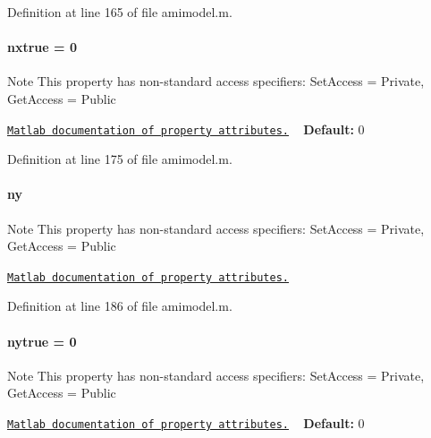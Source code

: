 Definition at line 165 of file amimodel.\+m.

\hypertarget{classamimodel_a49c476de14a021114feb8c95da04952a}{}
\paragraph[{nxtrue}]{\setlength{\rightskip}{0pt plus 5cm}nxtrue = 0}\label{classamimodel_a49c476de14a021114feb8c95da04952a}
\begin{DoxyNote}{Note}
This property has non-\/standard access specifiers\+: {\ttfamily Set\+Access = Private, Get\+Access = Public} 

\href{http://www.mathworks.com/help/matlab/matlab_oop/property-attributes.html}{\tt Matlab documentation of property attributes.} ~\newline
{\bfseries Default\+:} 0 
\end{DoxyNote}


Definition at line 175 of file amimodel.\+m.

\hypertarget{classamimodel_a289ca425eb368f1d582b6be2be0d3dfc}{}
\paragraph[{ny}]{\setlength{\rightskip}{0pt plus 5cm}ny}\label{classamimodel_a289ca425eb368f1d582b6be2be0d3dfc}
\begin{DoxyNote}{Note}
This property has non-\/standard access specifiers\+: {\ttfamily Set\+Access = Private, Get\+Access = Public} 

\href{http://www.mathworks.com/help/matlab/matlab_oop/property-attributes.html}{\tt Matlab documentation of property attributes.} 
\end{DoxyNote}


Definition at line 186 of file amimodel.\+m.

\hypertarget{classamimodel_ac91d7b36031ec122abc9f739692b02e8}{}
\paragraph[{nytrue}]{\setlength{\rightskip}{0pt plus 5cm}nytrue = 0}\label{classamimodel_ac91d7b36031ec122abc9f739692b02e8}
\begin{DoxyNote}{Note}
This property has non-\/standard access specifiers\+: {\ttfamily Set\+Access = Private, Get\+Access = Public} 

\href{http://www.mathworks.com/help/matlab/matlab_oop/property-attributes.html}{\tt Matlab documentation of property attributes.} ~\newline
{\bfseries Default\+:} 0 
\end{DoxyNote}


